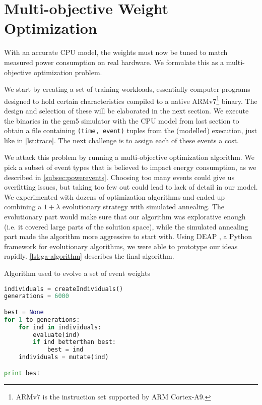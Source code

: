 \section{Multi-objective Weight Optimization}

With an accurate CPU model, the weights must now be tuned to match measured
power consumption on real hardware. We formulate this as a multi-objective
optimization problem.

We start by creating a set of training workloads, essentially computer programs
designed to hold certain characteristics compiled to a native
ARMv7\footnote{ARMv7 is the instruction set supported by ARM Cortex-A9.} binary.
The design and selection of these will be elaborated in the next section. We
execute the binaries in the gem5 simulator with the CPU model from last
section to obtain a file containing \texttt{(time, event)} tuples from the
(modelled) execution, just like in \autoref{lst:trace}. The next challenge is to
assign each of these events a cost.

We attack this problem by running a multi-objective optimization algorithm. We
pick a subset of event types that is believed to impact energy consumption, as
we described in \autoref{subsec:powerevents}. Choosing too many events could
give us overfitting issues, but taking too few out could lead to lack of detail
in our model. We experimented with dozens of optimization algorithms and ended
up combining a $1 + \lambda$ evolutionary strategy with simulated annealing. The
evolutionary part would make sure that our algorithm was explorative enough
(i.e. it covered large parts of the solution space), while the simulated
annealing part made the algorithm more aggressive to start with. Using DEAP
\cite{DEAP_JMLR2012}, a Python framework for evolutionary algorithms, we were
able to prototype our ideas rapidly. \autoref{lst:ga-algorithm} describes the
final algorithm.

\begin{algorithm}
\caption{Algorithm used to evolve a set of event weights}
\label{lst:ga-algorithm}
\begin{lstlisting}[language=python,style=algo]
individuals = createIndividuals()
generations = 6000

best = None
for 1 to generations:
    for ind in individuals:
        evaluate(ind)
        if ind betterthan best:
            best = ind
    individuals = mutate(ind)

print best
\end{lstlisting}
\end{algorithm}

